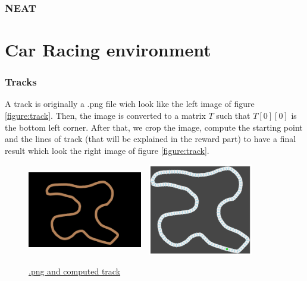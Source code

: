 \documentclass[11pt,a4paper]{article}
\newcounter{fig}
\begin{document}
		\section{NEAT}
	
	
	\part{Car Racing environment}
		\section{Tracks}
A track is originally a .png file wich look like the left image of figure \ref{figure:track}. Then, the image is converted to a matrix $T$ such that $T[0][0]$ is the bottom left corner. After that, we crop the image, compute the starting point and the lines of track (that will be explained in the reward part) to have a final result which look the right image of figure \ref{figure:track}.
\begin{center}
\label{figure:track}
	\begin{figure}[ht]
		\centering
		\includegraphics[width=5cm, height=4cm]{track_06.png}
		\includegraphics[width=5cm, height=4cm]{track_06_computed.png}
		\caption{\underline{.png and computed track}}
	\end{figure}
\end{center}

	
\end{document}
